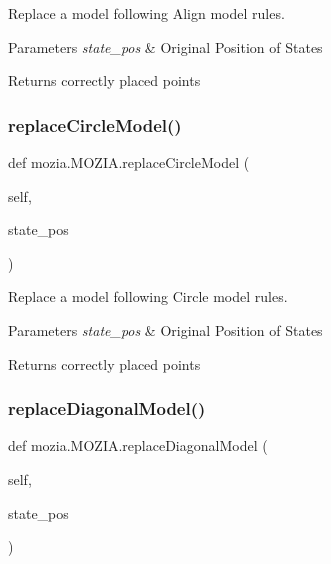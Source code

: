 Replace a model following Align model rules. 


\begin{DoxyParams}{Parameters}
{\em state\+\_\+pos} & Original Position of States \\
\hline
\end{DoxyParams}
\begin{DoxyReturn}{Returns}
correctly placed points 
\end{DoxyReturn}
\mbox{\label{classmozia_1_1MOZIA_ada3027d13bfaab95de212b41c9c74c35}} 
\subsubsection{\texorpdfstring{replaceCircleModel()}{replaceCircleModel()}}
{\footnotesize\ttfamily def mozia.\+M\+O\+Z\+I\+A.\+replace\+Circle\+Model (\begin{DoxyParamCaption}\item[{}]{self,  }\item[{}]{state\+\_\+pos }\end{DoxyParamCaption})}



Replace a model following Circle model rules. 


\begin{DoxyParams}{Parameters}
{\em state\+\_\+pos} & Original Position of States \\
\hline
\end{DoxyParams}
\begin{DoxyReturn}{Returns}
correctly placed points 
\end{DoxyReturn}
\mbox{\label{classmozia_1_1MOZIA_af995224d265feaf5ed9d92b1dd21a435}} 
\subsubsection{\texorpdfstring{replaceDiagonalModel()}{replaceDiagonalModel()}}
{\footnotesize\ttfamily def mozia.\+M\+O\+Z\+I\+A.\+replace\+Diagonal\+Model (\begin{DoxyParamCaption}\item[{}]{self,  }\item[{}]{state\+\_\+pos }\end{DoxyParamCaption})}



